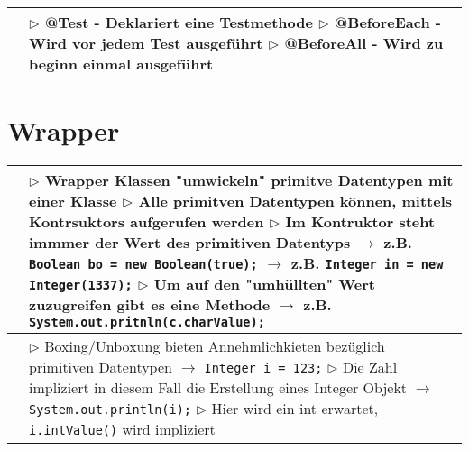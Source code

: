 \begin{table}[H]
\begin{tabular}{ | p{4cm} p{13.5cm} | }
	\makecell[l]{Notation} & 
	\makecell[l]
	{
	$\rhd$ @Test - Deklariert eine Testmethode \\
	$\rhd$ @BeforeEach - Wird vor jedem Test ausgeführt \\
	$\rhd$ @BeforeAll - Wird zu beginn einmal ausgeführt
	} 	\\ \hline

	
	\end{tabular}
	\end{table}



\section{Wrapper}


	\begin{table}[H]
	\label{Wrapper}
	\begin{tabular}{ | p{4cm} p{13.5cm} | }


	\hline
	\makecell[l]{Wrapper Klassen} & 
	\makecell[l]
	{
	$\rhd$ Wrapper Klassen "umwickeln" primitve Datentypen mit einer Klasse \\
	$\rhd$ Alle primitven Datentypen können, mittels Kontrsuktors aufgerufen werden \\
	$\rhd$ Im Kontruktor steht immmer der Wert des primitiven Datentyps \\
	$\rightarrow$ z.B. \texttt{Boolean bo = new Boolean(true);} \\
	$\rightarrow$ z.B. \texttt{Integer in = new Integer(1337);} \\
	$\rhd$ Um auf den "umhüllten" Wert zuzugreifen gibt es eine Methode \\
	$\rightarrow$ z.B. \texttt{System.out.pritnln(c.charValue);}
	} 	\\ \hline


	\makecell[l]{Boxing / Unboxing} & 
	\makecell[l]
	{
	$\rhd$ Boxing/Unboxung bieten Annehmlichkieten bezüglich primitiven Datentypen \\
	$\rightarrow$ \texttt{Integer i = 123;} \\
	$\rhd$ Die Zahl impliziert in diesem Fall die Erstellung eines Integer Objekt \\
	$\rightarrow$ \texttt{System.out.println(i);} \\
	$\rhd$ Hier wird ein int erwartet, \texttt{i.intValue()} wird impliziert
	} 	\\ \hline

	
	\end{tabular}
	\end{table}

